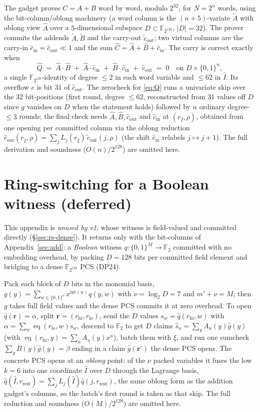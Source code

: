 \documentclass[11pt]{article}
\newcommand{\F}{\mathbb{F}}
\newcommand{\eq}{\operatorname{eq}}
\newcommand{\cube}[1]{\{0,1\}^{#1}}
\newcommand{\oA}{\widehat A}
\newcommand{\oB}{\widehat B}
\newcommand{\oC}{\widehat C}
\newcommand{\ocout}{\widehat{c}_{\mathrm{out}}}
\newcommand{\ocin}{\widehat{c}_{\mathrm{in}}}
\newcommand{\oQ}{\widehat Q}
\newcommand{\II}{\widehat I}
\newcommand{\D}{D}
\begin{document}
The gadget proves $C=A+B$ word by word, modulo $2^{32}$, for $N=2^n$ words, using the bit-column/oblong machinery (a word column is the $(n+5)$-variate $\widetilde A$ with oblong view $\oA$ over a $5$-dimensional subspace $\D\subset\F_{2^{128}}$, $|\D|=32$). The prover commits the addends $\widetilde A,\widetilde B$ and the carry-out $\widetilde c_{\mathrm{out}}$; two virtual columns are the carry-in $\ocin=\ocout\ll1$ and the sum $\oC=\oA+\oB+\ocin$. The carry is correct exactly when
\begin{equation}
\oQ \;=\; \oA\cdot\oB \;+\; \oA\cdot\ocin \;+\; \oB\cdot\ocin \;+\; \ocout \;=\;0
\quad\text{on } \D\times\cube n,
\label{eq:Q}
\end{equation}
a single $\F_{2^{128}}$-identity of degree $\le2$ in each word variable and $\le62$ in $\II$. Its overflow $e$ is bit $31$ of $\widehat c_{\mathrm{out}}$. The zerocheck for \eqref{eq:Q} runs a univariate skip over the $32$ bit-positions (first round, degree $\le62$, reconstructed from $31$ values off $\D$ since $g$ vanishes on $\D$ when the statement holds) followed by $n$ ordinary degree-$\le3$ rounds; the final check needs $\oA,\oB,\ocout$ and $\ocin$ at $(r_{\II},\rho)$, obtained from one opening per committed column via the oblong reduction $\ocout(r_{\II},\rho)=\sum_{j}L_j(r_{\II})\,\widetilde c_{\mathrm{out}}(j,\rho)$ (the shift $\ocin$ relabels $j\mapsto j+1$). The full derivation and soundness ($O(n)/2^{128}$) are omitted here.

\section{Ring-switching for a Boolean witness (deferred)}\label{sec:ringswitch}

This appendix is \emph{unused by v1}, whose witness is field-valued and committed directly (\S\ref{sec:rs-dense}). It returns only with the bit-columns of Appendix~\ref{sec:add}: a \emph{Boolean} witness $q:\cube{M}\to\F_2$ committed with no embedding overhead, by packing $D=128$ bits per committed field element and bridging to a dense $\F_{2^{128}}$ PCS (DP24).

Pack each block of $D$ bits in the monomial basis, $g(y)=\sum_{w\in\cube\nu}x^{\mathrm{int}(w)}q(y,w)$ with $\nu=\log_2 D=7$ and $m'+\nu=M$; then $g$ takes full field values and the dense PCS commits it at zero overhead. To open $\widehat q(\mathbf r)=\alpha$, split $\mathbf r=(r_{\mathrm{hi}},r_{\mathrm{lo}})$, send the $D$ values $s_w=\widehat q(r_{\mathrm{hi}},w)$ with $\alpha=\sum_w\eq(r_{\mathrm{lo}},w)s_w$, descend to $\F_2$ to get $D$ claims $\widehat s_u=\sum_y A_u(y)\widehat g(y)$ (with $\eq(r_{\mathrm{hi}},y)=\sum_u A_u(y)x^u$), batch them with $\xi$, and run one sumcheck $\sum_y B(y)\widehat g(y)=\beta$ ending in a claim $\widehat g(\mathbf r')$ the dense PCS opens. The concrete PCS opens at an \emph{oblong} point: of the $\nu$ packed variables it fuses the low $k=6$ into one coordinate $\II$ over $\D$ through the Lagrange basis, $\widehat q(\II,r_{\mathrm{rest}})=\sum_{j}L_j(\II)\widehat q(j,r_{\mathrm{rest}})$, the same oblong form as the addition gadget's columns, so the batch's first round is taken as that skip. The full reduction and soundness ($O(M)/2^{128}$) are omitted here.
\end{document}

